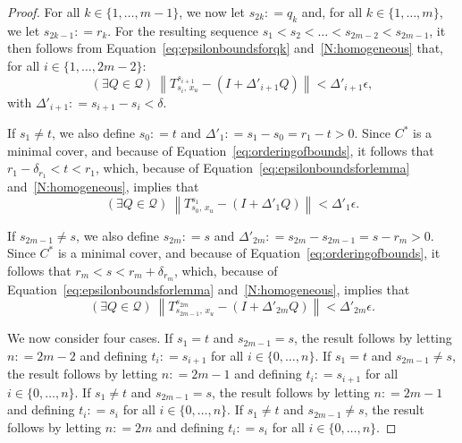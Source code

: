 \documentclass[10pt]{paper}
\theoremstyle{definition}
\newcommand{\rateset}{\mathcal{Q}}
\newcommand{\norm}[1]{\left\lVert #1 \right\rVert}
\newcommand{\coloneqq}{:\!=}
\begin{document}
\begin{proof}
For all $k\in\{1,\dots,m-1\}$, we now let $s_{2k}\coloneqq q_k$ and, for all $k\in\{1,\dots,m\}$, we let $s_{2k-1}\coloneqq r_k$. For the resulting sequence $s_1<s_2<\dots<s_{2m-2}<s_{2m-1}$, it then follows from Equation~\eqref{eq:epsilonboundsforqk} and~\ref{N:homogeneous} that, for all $i\in\{1,\dots,2m-2\}$:
\begin{equation*}
(\exists Q\in\rateset)
~
\norm{
T^{s_{i+1}}_{s_i,\,x_u}-(I+\Delta'_{i+1}Q)
}<\Delta'_{i+1}\epsilon,
\end{equation*}
with $\Delta'_{i+1}\coloneqq s_{i+1}-s_i<\delta$. 

If $s_1\neq t$, we also define $s_0\coloneqq t$ and $\Delta'_1\coloneqq s_1-s_0=r_1-t>0$. Since $C^*$ is a minimal cover, and because of Equation~\eqref{eq:orderingofbounds}, it follows that $r_1-\delta_{r_1}<t<r_1$, which, because of Equation~\eqref{eq:epsilonboundsforlemma} and~\ref{N:homogeneous}, implies that
\begin{equation*}
(\exists Q\in\rateset)
~
\norm{
T^{s_{1}}_{s_0,\,x_u}-(I+\Delta'_{1}Q)
}<\Delta'_{1}\epsilon.
\end{equation*}

If $s_{2m-1}\neq s$, we also define $s_{2m}\coloneqq s$ and $\Delta'_{2m}\coloneqq s_{2m}-s_{2m-1}=s-r_m>0$. Since $C^*$ is a minimal cover, and because of Equation~\eqref{eq:orderingofbounds}, it follows that $r_m<s<r_m+\delta_{r_m}$, which, because of Equation~\eqref{eq:epsilonboundsforlemma} and~\ref{N:homogeneous}, implies that
\begin{equation*}
(\exists Q\in\rateset)
~
\norm{
T^{s_{2m}}_{s_{2m-1},\,x_u}-(I+\Delta'_{2m}Q)
}<\Delta'_{2m}\epsilon.
\end{equation*}

We now consider four cases.
If $s_1=t$ and $s_{2m-1}=s$, the result follows by letting $n\coloneqq 2m-2$ and defining $t_i\coloneqq s_{i+1}$ for all $i\in\{0,\dots,n\}$. 
If $s_1=t$ and $s_{2m-1}\neq s$, the result follows by letting $n\coloneqq 2m-1$ and defining $t_i\coloneqq s_{i+1}$ for all $i\in\{0,\dots,n\}$.
If $s_1\neq t$ and $s_{2m-1}=s$, the result follows by letting $n\coloneqq 2m-1$ and defining $t_i\coloneqq s_{i}$ for all $i\in\{0,\dots,n\}$.
If $s_1\neq t$ and $s_{2m-1}\neq s$, the result follows by letting $n\coloneqq 2m$ and defining $t_i\coloneqq s_{i}$ for all $i\in\{0,\dots,n\}$.
\end{proof}
\end{document}

